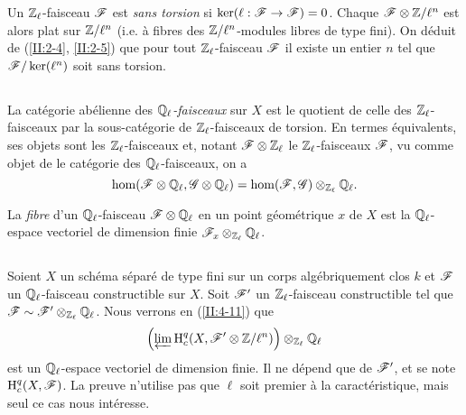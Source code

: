 Un $\mathbb{Z}_\ell$-faisceau $\mathscr{F}$ est \emph{sans torsion} si 
$\ker(\ell:\mathscr{F}\to\mathscr{F}) = 0$. Chaque $\mathscr{F}\otimes\mathbb{Z}/\ell^n$ est alors plat sur 
$\mathbb{Z}/\ell^n$ (i.e. à fibres des $\mathbb{Z}/\ell^n$-modules libres de type fini). On 
déduit de (\ref{II:2-4}, \ref{II:2-5}) que pour tout $\mathbb{Z}_\ell$-faisceau 
$\mathscr{F}$ il existe un entier $n$ tel que $\mathscr{F}/\ker(\ell^n)$ soit sans torsion. 





\subsection{}\label{II:2-9}

La catégorie abélienne des \emph{$\mathbb{Q}_\ell$-faisceaux} sur $X$ est le 
quotient de celle des $\mathbb{Z}_\ell$-faisceaux par la sous-catégorie de 
$\mathbb{Z}_\ell$-faisceaux de torsion. En termes équivalents, ses objets sont les 
$\mathbb{Z}_\ell$-faisceaux et, notant $\mathscr{F}\otimes\mathbb{Z}_\ell$ le $\mathbb{Z}_\ell$-faisceaux 
$\mathscr{F}$, vu comme objet de le catégorie des $\mathbb{Q}_\ell$-faisceaux, on a 
\[
  \hom(\mathscr{F}\otimes\mathbb{Q}_\ell,\mathscr{G}\otimes\mathbb{Q}_\ell) = \hom(\mathscr{F},\mathscr{G})\otimes_{\mathbb{Z}_\ell}\mathbb{Q}_\ell \text{.}
\]

La \emph{fibre} d'un $\mathbb{Q}_\ell$-faisceau $\mathscr{F}\otimes\mathbb{Q}_\ell$ en un point 
géométrique $x$ de $X$ est la $\mathbb{Q}_\ell$-espace vectoriel de dimension 
finie $\mathscr{F}_x\otimes_{\mathbb{Z}_\ell}\mathbb{Q}_\ell$. 





\subsection{}\label{II:2-10}

Soient $X$ un schéma séparé de type fini sur un corps algébriquement 
clos $k$ et $\mathscr{F}$ un $\mathbb{Q}_\ell$-faisceau constructible sur $X$. Soit $\mathscr{F}'$ un 
$\mathbb{Z}_\ell$-faisceau constructible tel que 
$\mathscr{F}\sim \mathscr{F}'\otimes_{\mathbb{Z}_\ell}\mathbb{Q}_\ell$. Nous verrons en (\ref{II:4-11}) que 
\[
  \left(\varprojlim \operatorname{H}_c^q(X,\mathscr{F}'\otimes \mathbb{Z}/\ell^n)\right)\otimes_{\mathbb{Z}_\ell}\mathbb{Q}_\ell
\]
est un $\mathbb{Q}_\ell$-espace vectoriel de dimension finie. Il ne dépend que de 
$\mathscr{F}'$, et se note $\operatorname{H}_c^q(X,\mathscr{F})$. La preuve n'utilise pas que $\ell$ soit 
premier à la caractéristique, mais seul ce cas nous intéresse. 





\subsection{}\label{II:2-11}

